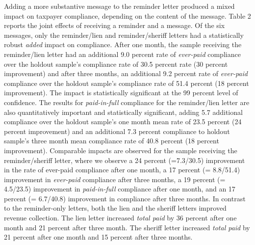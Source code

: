 \documentclass[12pt]{article}
\begin{document}
Adding a more substantive message to the reminder letter produced a
mixed impact on taxpayer compliance, depending on the content of the
message.  Table 2 reports the joint effects of receiving a reminder
and a message.  Of the six messages, only the reminder/lien and
reminder/sheriff letters had a statistically robust \textit{added}
impact on compliance.  After one month, the sample receiving the
reminder/lien letter had an additional 9.0 percent rate of
\textit{ever-paid} compliance over the holdout sample's compliance
rate of 30.5 percent rate (30 percent improvement) and after three
months, an additional 9.2 percent rate of \textit{ever-paid}
compliance over the holdout sample's compliance rate of 51.4 percent
(18 percent improvement).  The impact is statistically significant at
the 99 percent level of confidence.  The results for {\it
  paid-in-full} compliance for the reminder/lien letter are also
quantitatively important and statistically significant, adding 5.7
additional compliance over the holdout sample's one month mean rate of
23.5 percent (24 percent improvement) and an additional 7.3 percent
compliance to holdout sample's three month mean compliance rate of
40.8 percent (18 percent improvement).  Comparable impacts are
observed for the sample receiving the reminder/sheriff letter, where
we observe a 24 percent (=7.3/30.5) improvement in the rate of
ever-paid compliance after one month, a 17 percent (= 8.8/51.4)
improvement in \textit{ever-paid} compliance after three months, a 19
percent (= 4.5/23.5) improvement in \textit{paid-in-full} compliance
after one month, and an 17 percent (= 6.7/40.8) improvement in
compliance after three months. In contrast to the reminder-only
letters, both the lien and the sheriff letters improved revenue
collection. The lien letter increased {\it total paid} by 36 percent
after one month and 21 percent after three month.  The sheriff letter
increased {\it total paid} by 21 percent after one month and 15
percent after three months.
\end{document}
